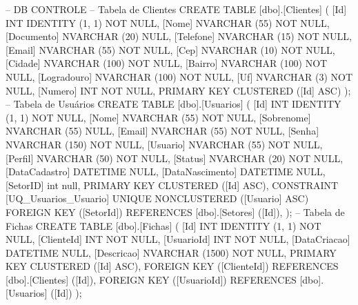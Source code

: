 -- DB CONTROLE
-- Tabela de Clientes
CREATE TABLE [dbo].[Clientes] (
    [Id]         INT            IDENTITY (1, 1) NOT NULL,
    [Nome]       NVARCHAR (55)  NOT NULL,
    [Documento]  NVARCHAR (20)  NULL,
    [Telefone]   NVARCHAR (15)  NOT NULL,
    [Email]      NVARCHAR (55)  NOT NULL,
    [Cep]        NVARCHAR (10)  NOT NULL,
    [Cidade]     NVARCHAR (100) NOT NULL,
    [Bairro]     NVARCHAR (100) NOT NULL,
    [Logradouro] NVARCHAR (100) NOT NULL,
    [Uf]         NVARCHAR (3)   NOT NULL,
    [Numero]     INT            NOT NULL,
    PRIMARY KEY CLUSTERED ([Id] ASC)
);
-- Tabela de Usuários
CREATE TABLE [dbo].[Usuarios] (
    [Id]             INT            IDENTITY (1, 1) NOT NULL,
    [Nome]           NVARCHAR (55)  NOT NULL,
    [Sobrenome]      NVARCHAR (55)  NULL,
    [Email]          NVARCHAR (55)  NOT NULL,
    [Senha]          NVARCHAR (150) NOT NULL,
    [Usuario]        NVARCHAR (55)  NOT NULL,
    [Perfil]         NVARCHAR (50)  NOT NULL,
    [Status]         NVARCHAR (20)  NOT NULL,
    [DataCadastro]   DATETIME       NULL,
    [DataNascimento] DATETIME       NULL,
	[SetorID]        int null,
    PRIMARY KEY CLUSTERED ([Id] ASC),
    CONSTRAINT [UQ_Usuarios_Usuario] UNIQUE NONCLUSTERED ([Usuario] ASC)
	FOREIGN KEY ([SetorId]) REFERENCES [dbo].[Setores] ([Id]),
);
-- Tabela de Fichas
CREATE TABLE [dbo].[Fichas] (
    [Id]          INT             IDENTITY (1, 1) NOT NULL,
    [ClienteId]   INT             NOT NULL,
    [UsuarioId]   INT             NOT NULL,
    [DataCriacao] DATETIME        NULL,
    [Descricao]   NVARCHAR (1500) NOT NULL,
    PRIMARY KEY CLUSTERED ([Id] ASC),
    FOREIGN KEY ([ClienteId]) REFERENCES [dbo].[Clientes] ([Id]),
    FOREIGN KEY ([UsuarioId]) REFERENCES [dbo].[Usuarios] ([Id])
);

